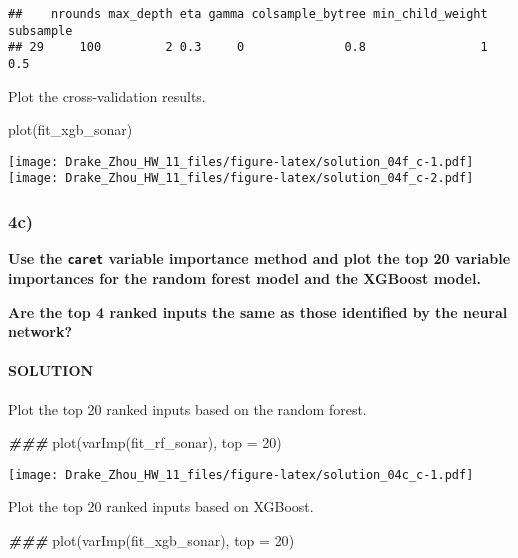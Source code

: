 \documentclass[
]{article}
\newenvironment{Shaded}{\begin{snugshade}}{\end{snugshade}}
\newcommand{\AttributeTok}[1]{\textcolor[rgb]{0.77,0.63,0.00}{#1}}
\newcommand{\DecValTok}[1]{\textcolor[rgb]{0.00,0.00,0.81}{#1}}
\newcommand{\DocumentationTok}[1]{\textcolor[rgb]{0.56,0.35,0.01}{\textbf{\textit{#1}}}}
\newcommand{\FunctionTok}[1]{\textcolor[rgb]{0.00,0.00,0.00}{#1}}
\newcommand{\NormalTok}[1]{#1}
\begin{document}
\begin{verbatim}
##    nrounds max_depth eta gamma colsample_bytree min_child_weight subsample
## 29     100         2 0.3     0              0.8                1       0.5
\end{verbatim}

Plot the cross-validation results.

\begin{Shaded}
\begin{Highlighting}[]
\FunctionTok{plot}\NormalTok{(fit\_xgb\_sonar)}
\end{Highlighting}
\end{Shaded}

\texttt{[image: Drake\_Zhou\_HW\_11\_files/figure-latex/solution\_04f\_c-1.pdf]}
\texttt{[image: Drake\_Zhou\_HW\_11\_files/figure-latex/solution\_04f\_c-2.pdf]}

\hypertarget{c-3}{%
\subsubsection{4c)}\label{c-3}}

\textbf{Use the \texttt{caret} variable importance method and plot the
top 20 variable importances for the random forest model and the XGBoost
model.}

\textbf{Are the top 4 ranked inputs the same as those identified by the
neural network?}

\hypertarget{solution-19}{%
\paragraph{SOLUTION}\label{solution-19}}

Plot the top 20 ranked inputs based on the random forest.

\begin{Shaded}
\begin{Highlighting}[]
\DocumentationTok{\#\#\#}
\FunctionTok{plot}\NormalTok{(}\FunctionTok{varImp}\NormalTok{(fit\_rf\_sonar), }\AttributeTok{top =} \DecValTok{20}\NormalTok{)}
\end{Highlighting}
\end{Shaded}

\texttt{[image: Drake\_Zhou\_HW\_11\_files/figure-latex/solution\_04c\_c-1.pdf]}

Plot the top 20 ranked inputs based on XGBoost.

\begin{Shaded}
\begin{Highlighting}[]
\DocumentationTok{\#\#\#}
\FunctionTok{plot}\NormalTok{(}\FunctionTok{varImp}\NormalTok{(fit\_xgb\_sonar), }\AttributeTok{top =} \DecValTok{20}\NormalTok{)}
\end{Highlighting}
\end{Shaded}
\end{document}

